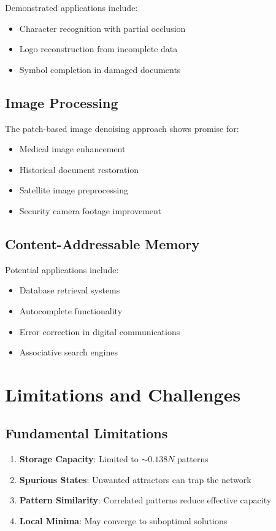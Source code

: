 \documentclass[11pt,a4paper]{article}
\begin{document}
Demonstrated applications include:
\begin{itemize}
    \item Character recognition with partial occlusion
    \item Logo reconstruction from incomplete data
    \item Symbol completion in damaged documents
\end{itemize}

\subsection{Image Processing}

The patch-based image denoising approach shows promise for:
\begin{itemize}
    \item Medical image enhancement
    \item Historical document restoration
    \item Satellite image preprocessing
    \item Security camera footage improvement
\end{itemize}

\subsection{Content-Addressable Memory}

Potential applications include:
\begin{itemize}
    \item Database retrieval systems
    \item Autocomplete functionality
    \item Error correction in digital communications
    \item Associative search engines
\end{itemize}

\section{Limitations and Challenges}

\subsection{Fundamental Limitations}

\begin{enumerate}
    \item \textbf{Storage Capacity}: Limited to $\sim 0.138N$ patterns
    \item \textbf{Spurious States}: Unwanted attractors can trap the network
    \item \textbf{Pattern Similarity}: Correlated patterns reduce effective capacity
    \item \textbf{Local Minima}: May converge to suboptimal solutions
\end{enumerate}
\end{document}
